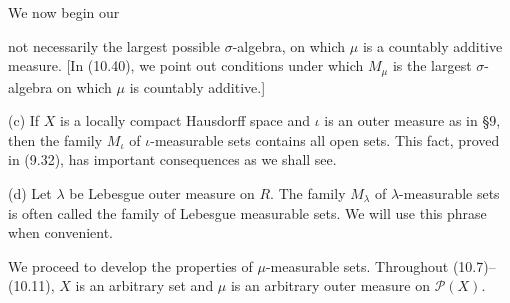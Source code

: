 We now begin our

not necessarily the largest possible $\sigma$-algebra, on which $\mu$ is a countably additive measure. [In (10.40), we point out conditions under which $M_\mu$ is the largest $\sigma$-algebra on which $\mu$ is countably additive.]

(c) If $X$ is a locally compact Hausdorff space and $\iota$ is an outer measure as in §9, then the family $M_\iota$ of $\iota$-measurable sets contains all open sets. This fact, proved in (9.32), has important consequences as we shall see.

(d) Let $\lambda$ be Lebesgue outer measure on $R$. The family $M_\lambda$ of $\lambda$-measurable sets is often called the family of Lebesgue measurable sets. We will use this phrase when convenient.

We proceed to develop the properties of $\mu$-measurable sets. Throughout (10.7)–(10.11), $X$ is an arbitrary set and $\mu$ is an arbitrary outer measure on $\mathcal{P}(X)$.